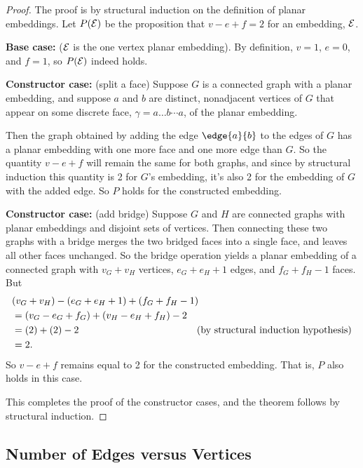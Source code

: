 \begin{proof}
The proof is by structural induction on the definition of planar
embeddings.  Let $P(\mathcal{E})$ be the proposition that $v - e + f = 2$ for an
embedding, $\mathcal{E}$.

\textbf{Base case:} ($\mathcal{E}$ is the one vertex planar embedding).
By definition, $v=1$, $e=0$, and $f=1$, so $P(\mathcal{E})$ indeed holds.

\textbf{Constructor case:} (split a face) Suppose $G$ is a connected graph
with a planar embedding, and suppose $a$ and $b$ are distinct, nonadjacent
vertices of $G$ that appear on some discrete face,
$\gamma= a \dots b \cdots a$, of the planar embedding.

Then the graph obtained by adding the edge $\edge{a}{b}$ to the edges of
$G$ has a planar embedding with one more face and one more edge than $G$.
So the quantity $v-e+f$ will remain the same for both graphs, and since by
structural induction this quantity is 2 for $G$'s embedding, it's also 2
for the embedding of $G$ with the added edge.  So $P$ holds for the
constructed embedding.

\textbf{Constructor case:} (add bridge) Suppose $G$ and $H$ are connected
graphs with planar embeddings and disjoint sets of vertices.  Then
connecting these two graphs with a bridge merges the two bridged faces
into a single face, and leaves all other faces unchanged.  So the bridge
operation yields a planar embedding of a connected graph with $v_G +v_H$
vertices, $e_G + e_H +1$ edges, and $f_G + f_H - 1$ faces.  But
\begin{align*}
\lefteqn{(v_G +v_H) - (e_G + e_H +1) + (f_G + f_H - 1)}\\
   & = (v_G  - e_G + f_G) + (v_H  - e_H  + f_H) -2\\
   & = (2)+(2)-2 & \text{(by structural induction hypothesis)}\\
   & = 2.
\end{align*}
So $v-e+f$ remains equal to 2 for the constructed embedding.  That is, $P$
also holds in this case.

This completes the proof of the constructor cases, and the theorem follows
by structural induction.
\end{proof}

\iffalse
\mfigure{!}{1in}{planar-assumptions}
\fi

\subsection{Number of Edges versus Vertices}

